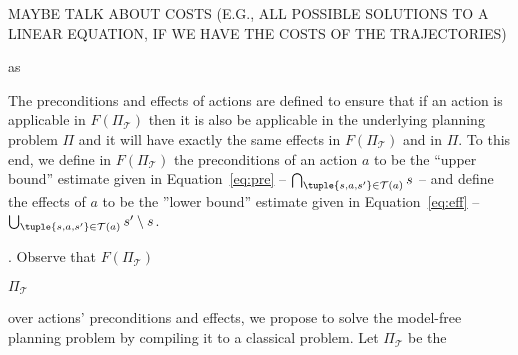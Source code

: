 MAYBE TALK ABOUT COSTS (E.G., ALL POSSIBLE SOLUTIONS TO A LINEAR EQUATION, IF WE HAVE THE COSTS OF THE TRAJECTORIES)
































as 

The preconditions and effects of actions are defined to ensure that 
if an action is applicable in $F(\Pi_\mathcal{T})$ then it is also be applicable in the underlying planning problem $\Pi$ and it will have exactly the same effects in $F(\Pi_\mathcal{T})$ and in $\Pi$. To this end, we define in $F(\Pi_\mathcal{T})$ the preconditions of an action $a$ to be the ``upper bound'' estimate given in Equation~\ref{eq:pre} -- $\bigcap_{\tuple{s, a, s'}\in \mathcal{T}(a)} s$ -- 
and define the effects of $a$ to be the ''lower bound'' estimate given in 
Equation~\ref{eq:eff} -- $\bigcup_{\tuple{s,a,s'}\in\mathcal{T}(a)} s'\setminus s$. 







. %
Observe that $F(\Pi_\mathcal{T})$


$\Pi_\mathcal{T}$ 


over actions' preconditions and effects, we propose to solve the model-free planning problem by compiling it to a classical \SAS{} problem. 
Let $\Pi_\mathcal{T}$ be the 



